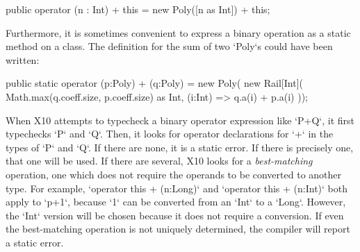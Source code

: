 \begin{ex}
% 
\begin{xten}
   public operator (n : Int) + this 
          = new Poly([n as Int]) + this;
\end{xten}
% 
%     

Furthermore, it is sometimes convenient to express a binary operation as a
static method on a class. 
The definition for the sum of two
\xcd`Poly`s could have been written:
\begin{xten}
  public static operator (p:Poly) + (q:Poly) =  new Poly(
     new Rail[Int](
        Math.max(q.coeff.size, p.coeff.size) as Int,
        (i:Int) => q.a(i) + p.a(i)
     ));
\end{xten}
%
% 
%     

\end{ex}

When X10 attempts to typecheck a binary operator expression like \xcd`P+Q`, it
first typechecks \xcd`P` and \xcd`Q`. Then, it looks for operator declarations
for \xcd`+` in the types of \xcd`P` and \xcd`Q`. If there are none, it is a
static error. If there is precisely one, that one will be used. If there are
several, X10 looks for a {\em best-matching} operation, \viz{} one which does
not require the operands to be converted to another type. For example,
\xcd`operator this + (n:Long)` and \xcd`operator this + (n:Int)` both apply to
\xcd`p+1`, because \xcd`1` can be converted from an \xcd`Int` to a \xcd`Long`.
However, the \xcd`Int` version will be chosen because it does not require a
conversion. If even the best-matching operation is not uniquely determined,
the compiler will report a static error.


